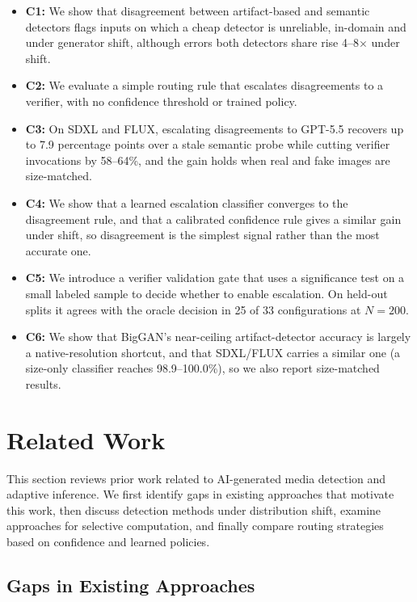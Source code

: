 \documentclass{ieeeaccess}
\begin{document}
\begin{itemize}
    \item \textbf{C1:} We show that disagreement between artifact-based and semantic detectors flags inputs on which a cheap detector is unreliable, in-domain and under generator shift, although errors both detectors share rise 4--8$\times$ under shift.

    \item \textbf{C2:} We evaluate a simple routing rule that escalates disagreements to a verifier, with no confidence threshold or trained policy.

    \item \textbf{C3:} On SDXL and FLUX, escalating disagreements to GPT-5.5 recovers up to 7.9 percentage points over a stale semantic probe while cutting verifier invocations by 58--64\%, and the gain holds when real and fake images are size-matched.

    \item \textbf{C4:} We show that a learned escalation classifier converges to the disagreement rule, and that a calibrated confidence rule gives a similar gain under shift, so disagreement is the simplest signal rather than the most accurate one.

    \item \textbf{C5:} We introduce a verifier validation gate that uses a significance test on a small labeled sample to decide whether to enable escalation. On held-out splits it agrees with the oracle decision in 25 of 33 configurations at $N{=}200$.

    \item \textbf{C6:} We show that BigGAN's near-ceiling artifact-detector accuracy is largely a native-resolution shortcut, and that SDXL/FLUX carries a similar one (a size-only classifier reaches 98.9--100.0\%), so we also report size-matched results.
\end{itemize}

\section{Related Work}
This section reviews prior work related to AI-generated media detection and adaptive inference. We first identify gaps in existing approaches that motivate this work, then discuss detection methods under distribution shift, examine approaches for selective computation, and finally compare routing strategies based on confidence and learned policies.

\subsection{Gaps in Existing Approaches}
\end{document}
